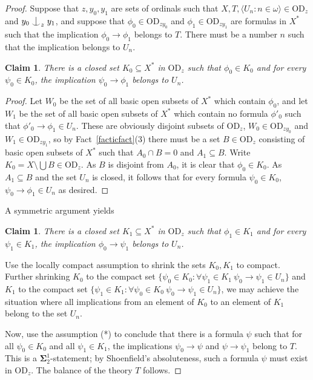 \documentclass{article}
\newcommand{\gw}{\omega}
\newcommand{\forkindep}[1][]{%
  \mathrel{
    \mathop{
      \vcenter{
        \hbox{\oalign{\noalign{\kern-.3ex}\hfil$\vert$\hfil\cr
              \noalign{\kern-.7ex}
              $\smile$\cr\noalign{\kern-.3ex}}}
      }
    }\displaylimits_{#1}
  }
}
\newcommand{\vd}{\mathrm{OD}}
\newtheorem{claim}[theorem]{Claim}
\theoremstyle{definition}
\begin{document}
\begin{proof}
Suppose that $z, y_0, y_1$ are sets of ordinals such that $X, T, \langle U_n\colon n\in\gw\rangle\in\vd_z$ and $y_0\forkindep_zy_1$, and suppose that $\phi_0\in\vd_{zy_0}$ and $\phi_1\in\vd_{zy_1}$ are formulas in $X^*$ such that the implication $\phi_0\to\phi_1$ belongs to $T$. There must be a number $n$ such that the implication belongs to $U_n$.





\begin{claim}
There is a closed set $K_0\subseteq X^*$ in $\vd_z$ such that $\phi_0\in K_0$ and for every $\psi_0\in K_0$, the implication $\psi_0\to\phi_1$ belongs to $U_n$.
\end{claim}

\begin{proof}
Let $W_0$ be the set of all basic open subsets of $X^*$ which contain $\phi_0$, and let $W_1$ be the set of all basic open subsets of $X^*$ which contain no formula $\phi'_0$ such that $\phi'_0\to\phi_1\in U_n$. These are obviously disjoint subsets of $\vd_z$, $W_0\in\vd_{zy_0}$ and $W_1\in\vd_{zy_1}$, so by Fact~\ref{facticfact}(3) there must be a set $B\in\vd_z$ consisting of basic open subsets of $X^*$ such that $A_0\cap B=0$ and $A_1\subseteq B$. Write $K_0=X\setminus \bigcup B\in\vd_z$. As $B$ is disjoint from $A_0$, it is clear that $\phi_0\in K_0$. As $A_1\subseteq B$ and the set $U_n$ is closed, it follows that for every formula $\psi_0\in K_0$, $\psi_0\to\phi_1\in U_n$ as desired.
\end{proof}

\noindent A symmetric argument yields

\begin{claim}
There is a closed set $K_1\subseteq X^*$ in $\vd_z$ such that $\phi_1\in K_1$ and for every $\psi_1\in K_1$, the implication $\phi_0\to\psi_1$ belongs to $U_n$.
\end{claim}


\noindent Use the locally compact assumption to shrink the sets $K_0, K_1$ to compact. Further shrinking $K_0$ to the compact set $\{\psi_0\in K_0\colon\forall \psi_1\in K_1\ \psi_0\to\psi_1\in U_n\}$  and $K_1$ to the compact set $\{\psi_1\in K_1\colon\forall \psi_0\in K_0\ \psi_0\to\psi_1\in U_n\}$, we may achieve the situation where all implications from an element of $K_0$ to an element of $K_1$ belong to the set $U_n$.

Now, use the assumption (*) to conclude that there is a formula $\psi$ such that for all $\psi_0\in K_0$ and all $\psi_1\in K_1$, the implications $\psi_0\to\psi$ and $\psi\to\psi_1$ belong to $T$. This is a ${\mathbf\Sigma}^1_2$-statement; by Shoenfield's absoluteness, such a formula $\psi$ must exist in $\vd_z$. The balance of the theory $T$ follows.
\end{proof}
\end{document}
